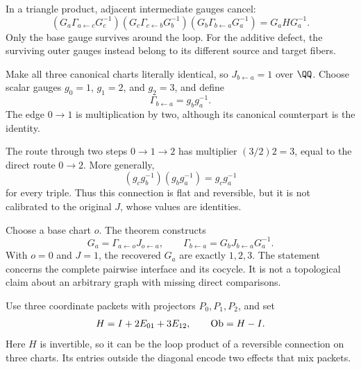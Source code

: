 In a triangle product, adjacent intermediate gauges cancel:
\[
(G_a\Gamma_{a\leftarrow c}G_c^{-1})
(G_c\Gamma_{c\leftarrow b}G_b^{-1})
(G_b\Gamma_{b\leftarrow a}G_a^{-1})
=G_aHG_a^{-1}.
\]
Only the base gauge survives around the loop. For the additive defect, the surviving outer gauges instead belong to its different source and target fibers.


Make all three canonical charts literally identical, so $J_{b\leftarrow a}=1$ over $\QQ$. Choose scalar gauges $g_0=1$, $g_1=2$, and $g_2=3$, and define
\[
\Gamma_{b\leftarrow a}=g_b g_a^{-1}.
\]
The edge $0\to1$ is multiplication by two, although its canonical counterpart is the identity.


The route through two steps $0\to1\to2$ has multiplier $(3/2)2=3$, equal to the direct route $0\to2$. More generally,
\[
(g_cg_b^{-1})(g_bg_a^{-1})=g_cg_a^{-1}
\]
for every triple. Thus this connection is flat and reversible, but it is not calibrated to the original $J$, whose values are identities.

Choose a base chart $o$. The theorem constructs
\[
G_a=\Gamma_{a\leftarrow o}J_{o\leftarrow a},
\qquad
\Gamma_{b\leftarrow a}=G_bJ_{b\leftarrow a}G_a^{-1}.
\]
With $o=0$ and $J=1$, the recovered $G_a$ are exactly $1,2,3$. The statement concerns the complete pairwise interface and its cocycle. It is not a topological claim about an arbitrary graph with missing direct comparisons.


Use three coordinate packets with projectors $P_0,P_1,P_2$, and set
\[
H=I+2E_{01}+3E_{12},\qquad \operatorname{Ob}=H-I.
\]
Here $H$ is invertible, so it can be the loop product of a reversible connection on three charts. Its entries outside the diagonal encode two effects that mix packets.

